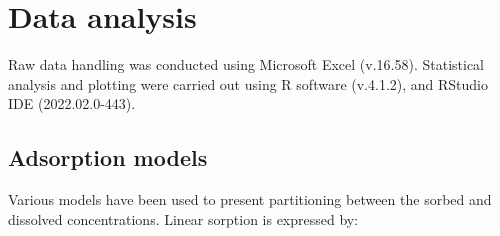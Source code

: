\begin{table}
\centering
\caption{Absolute recovery, relative recovery, and matrix effects for the target analytes from solid-phase extraction (SPE).}
\label{tab:QAQC}
\end{table}




\section{Data analysis}\label{sec:data_analysis}
Raw data handling was conducted using Microsoft Excel (v.16.58). Statistical analysis and plotting were carried out using R software (v.4.1.2), and RStudio IDE (2022.02.0-443).

\subsection{Adsorption models \label{sec:models}}
Various models have been used to present partitioning between the sorbed and dissolved concentrations. Linear sorption is expressed by: 

